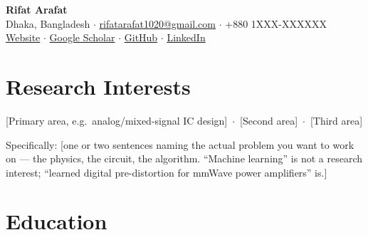 \documentclass[11pt,letterpaper]{article}   %
\makeatletter
\newcommand{\myname}{Rifat Arafat}          %
\newcommand{\myemail}{rifatarafat1020@gmail.com}
\newcommand{\myphone}{+880 1XXX-XXXXXX}
\makeatother
\begin{document}

\begin{center}
  {\LARGE\bfseries\color{accent}\myname}\\[5pt]
  {\small
    Dhaka, Bangladesh \quad$\cdot$\quad
    \href{mailto:\myemail}{\myemail} \quad$\cdot$\quad
    \myphone
  }\\[3pt]
  {\small
    \href{https://yourusername.github.io}{Website} \quad$\cdot$\quad
    \href{https://scholar.google.com/citations?user=XXXX}{Google Scholar} \quad$\cdot$\quad
    \href{https://github.com/yourusername}{GitHub} \quad$\cdot$\quad
    \href{https://linkedin.com/in/yourusername}{LinkedIn}
  }
\end{center}
\vspace{2pt}

\section{Research Interests}
[Primary area, e.g.\ analog/mixed-signal IC design] \,$\cdot$\, [Second area] \,$\cdot$\, [Third area]

\smallskip
\noindent Specifically: [one or two sentences naming the actual problem you want to work on
— the physics, the circuit, the algorithm. ``Machine learning'' is not a research
interest; ``learned digital pre-distortion for mmWave power amplifiers'' is.]

\section{Education}
\end{document}
